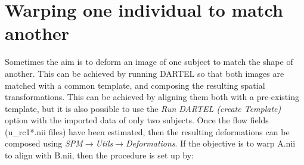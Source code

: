 \section{Warping one individual to match another}
Sometimes the aim is to deform an image of one subject to match the shape of another.
This can be achieved by running DARTEL so that both images are matched with a common template, and composing the resulting spatial transformations.
This can be achieved by aligning them both with a pre-existing template, but it is also possible to use the \emph{Run DARTEL (create Template)} option with the imported data of only two subjects.
Once the flow fields (u\_rc1*.nii files) have been estimated, then the resulting deformations can be composed using \emph{SPM$\rightarrow$Utils$\rightarrow$Deformations}.
If the objective is to warp A.nii to align with B.nii, then the procedure is set up by:
